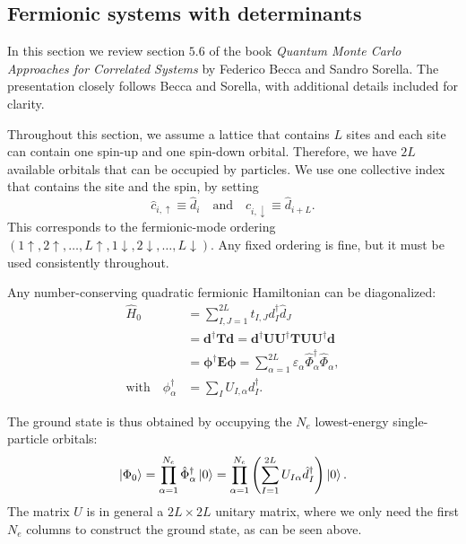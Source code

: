 \documentclass[../../main.tex]{subfiles}
\begin{document}
\subsection{Fermionic systems with determinants}
\label{sec:fermionic-systems-with-determinants}
In this section we review section $5.6$ of the book \emph{Quantum Monte Carlo Approaches for Correlated Systems} by Federico Becca and Sandro Sorella. The presentation closely follows Becca and Sorella, with additional details included for clarity.

Throughout this section, we assume a lattice that contains $L$ sites and each site can contain one spin-up and one spin-down orbital. Therefore, we have $2L$ available orbitals that can be occupied by particles. We use one collective index that contains the site and the spin, by setting
\begin{equation}
    \hat c_{i, \uparrow} \equiv \hat d_i \quad \text{and} \quad \hat c_{i, \downarrow} \equiv \hat d_{i+L} . \label{eq:collective-index-site-and-spin}
\end{equation}
This corresponds to the fermionic-mode ordering $(1\uparrow,2\uparrow,\ldots,L\uparrow,
1\downarrow,2\downarrow,\ldots,L\downarrow)$. Any fixed ordering is fine, but it must be used consistently throughout.

Any number-conserving quadratic fermionic Hamiltonian can be diagonalized:
\begin{align}
    \hat H_0
    &= \sum_{I,J=1}^{2L}
    t_{I,J} d_I^\dagger \hat d_J \\
    &= \bm d^\dagger \bm T \bm d 
    = \bm d^\dagger \bm U \bm U^\dagger \bm T \bm U \bm U^\dagger \bm d \\
    &= \bm \phi^\dagger \bm E \bm \phi 
    =\sum_{\alpha=1}^{2L}
    \varepsilon_\alpha \hat \Phi_\alpha^\dagger \hat \Phi_\alpha ,  \\
    \text{with} \quad \phi^\dagger_\alpha &= \sum_I U_{I,\alpha} d_I^\dagger .
    \label{eq:quadratic-hamiltonian-diagonal}
\end{align}

The ground state is thus obtained by occupying the $N_{e}$ lowest-energy
single-particle orbitals:
\begin{equation}
    \left\lvert \Phi_0 \right\rangle
    =
    \prod_{\alpha=1}^{N_{e}}
    \hat \Phi_\alpha^\dagger \left\lvert 0 \right\rangle
    =
    \prod_{\alpha=1}^{N_{e}}
    \left(
        \sum_{I=1}^{2L}
        U_{I\alpha}\hat d_I^\dagger
    \right)
    \left\lvert 0 \right\rangle.
    \label{eq:slater-ground-state}
\end{equation}
The matrix $U$ is in general a $2L\times 2L$ unitary matrix, where we only need the first $N_e$ columns to construct the ground state, as can be seen above.
\end{document}
